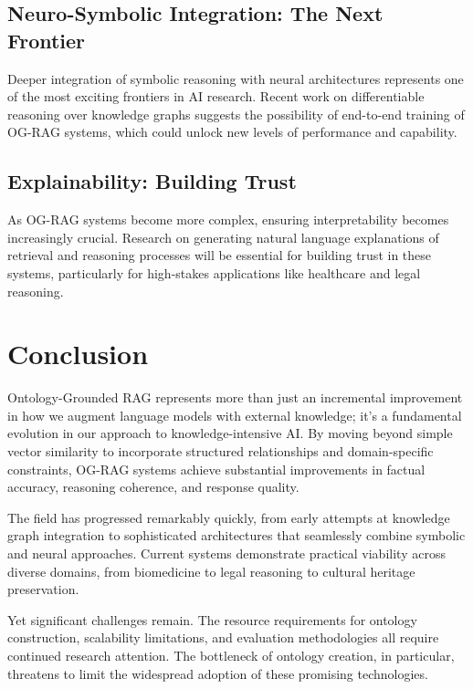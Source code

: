 \subsection{Neuro-Symbolic Integration: The Next Frontier}

Deeper integration of symbolic reasoning with neural architectures represents one of the most exciting frontiers in AI research. Recent work on differentiable reasoning over knowledge graphs suggests the possibility of end-to-end training of OG-RAG systems, which could unlock new levels of performance and capability.

\subsection{Explainability: Building Trust}

As OG-RAG systems become more complex, ensuring interpretability becomes increasingly crucial. Research on generating natural language explanations of retrieval and reasoning processes will be essential for building trust in these systems, particularly for high-stakes applications like healthcare and legal reasoning.

\section{Conclusion}

Ontology-Grounded RAG represents more than just an incremental improvement in how we augment language models with external knowledge; it's a fundamental evolution in our approach to knowledge-intensive AI. By moving beyond simple vector similarity to incorporate structured relationships and domain-specific constraints, OG-RAG systems achieve substantial improvements in factual accuracy, reasoning coherence, and response quality.

The field has progressed remarkably quickly, from early attempts at knowledge graph integration to sophisticated architectures that seamlessly combine symbolic and neural approaches. Current systems demonstrate practical viability across diverse domains, from biomedicine to legal reasoning to cultural heritage preservation.

Yet significant challenges remain. The resource requirements for ontology construction, scalability limitations, and evaluation methodologies all require continued research attention. The bottleneck of ontology creation, in particular, threatens to limit the widespread adoption of these promising technologies.

